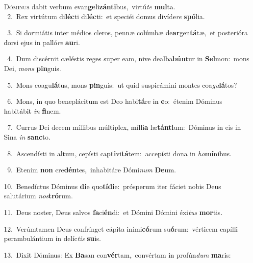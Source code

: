 \lettrine{\initial\textcolor{\initialcolor}{D}}{óminus} dabit verbum evan\-\textbf{ge}\-li\-\textbf{zán}\-\textbf{ti}bus,~\star virtú\textit{te} \textbf{mul}\-ta.\\
{\numbfont\textcolor{\numbcolor}{~2.}}~Rex virtútum di\-\textbf{léc}\-ti di\-\textbf{léc}\-ti:~\star et speciéi domus divíde\textit{re} \textbf{spó}\-lia.\par
{\numbfont\textcolor{\numbcolor}{~3.}}~Si dormiátis inter médios cleros, pennæ colúmbæ de\-\textbf{ar}\-gen\-\textbf{tá}\-tæ,~\star et posterióra dorsi ejus in palló\textit{re} \textbf{au}\-ri.\par
{\numbfont\textcolor{\numbcolor}{~4.}}~Dum discérnit cæléstis reges super eam, nive dealba\-\textbf{bún}\-tur in \textbf{Sel}\-mon:~\star mons Dei, \textit{mons} \textbf{pin}\-guis.\par
{\numbfont\textcolor{\numbcolor}{~5.}}~Mons coagu\-\textbf{lá}\-tus, mons \textbf{pin}\-guis:~\star ut quid suspicámini montes coa\-\textit{gu}\-\textbf{lá}tos?\par
{\numbfont\textcolor{\numbcolor}{~6.}}~Mons, in quo beneplácitum est Deo habi\-\textbf{tá}\-re in \textbf{e}\-o:~\star étenim Dóminus habitábit \textit{in} \textbf{fi}\-nem.\par
{\numbfont\textcolor{\numbcolor}{~7.}}~Currus Dei decem míllibus múltiplex, mílli\textbf{a} læ\-\textbf{tán}\-\textbf{ti}um:~\star Dóminus in eis in Sina \textit{in} \textbf{sanc}\-to.\par
{\numbfont\textcolor{\numbcolor}{~8.}}~Ascendísti in altum, cepísti cap\-\textbf{ti}\-vi\-\textbf{tá}\-tem:~\star accepísti dona in \textit{ho}\-\textbf{mí}nibus.\par
{\numbfont\textcolor{\numbcolor}{~9.}}~Etenim \textbf{non} cre\-\textbf{dén}\-tes,~\star inhabitáre Dómi\textit{num} \textbf{De}\-um.\par
{\numbfont\textcolor{\numbcolor}{10.}}~Benedíctus Dóminus \textbf{di}\-e quo\-\textbf{tí}\-\textbf{di}e:~\star prósperum iter fáciet nobis Deus salutárium \textit{nos}\-\textbf{tró}rum.\par
{\numbfont\textcolor{\numbcolor}{11.}}~Deus noster, Deus salvos \textbf{fa}\-ci\-\textbf{én}\-di:~\star et Dómini Dómini éxi\textit{tus} \textbf{mor}\-tis.\par
{\numbfont\textcolor{\numbcolor}{12.}}~Verúmtamen Deus confrínget cápita inimi\-\textbf{có}\-rum su\-\textbf{ó}\-rum:~\star vérticem capílli perambulántium in delíc\textit{tis} \textbf{su}\-is.\par
{\numbfont\textcolor{\numbcolor}{13.}}~Dixit Dóminus: Ex \textbf{Ba}\-san con\-\textbf{vér}\-tam,~\star convértam in profún\textit{dum} \textbf{ma}\-ris:\par
